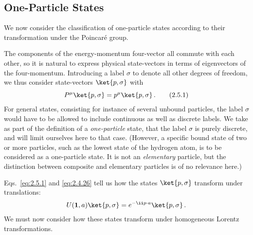 \subsection{One-Particle States}

We now consider the classification of one-particle states according to their
transformation under the Poincar\'e group.

The components of the energy-momentum four-vector all commute with each other,
so it is natural to express physical state-vectors in terms of eigenvectors of
the four-momentum. Introducing a label $\sigma$ to denote all other degrees of
freedom, we thus consider state-vectors $\ket{p,\sigma}$ with
\begin{equation}
P^\mu\ket{p,\sigma}=p^\mu\ket{p,\sigma}\,.
\tag{2.5.1}\label{eq:2.5.1}
\end{equation}
For general states, consisting for instance of several unbound particles, the
label $\sigma$ would have to be allowed to include continuous as well as
discrete labels. We take as part of the definition of a \emph{one-particle}
state, that the label $\sigma$ is purely discrete, and will limit ourselves
here to that case. (However, a specific bound state of two or more particles,
such as the lowest state of the hydrogen atom, is to be considered as a
one-particle state. It is not an \emph{elementary} particle, but the distinction
between composite and elementary particles is of no relevance here.)

Eqs.~\eqref{eq:2.5.1} and \eqref{eq:2.4.26} tell us how the states $\ket{p,\sigma}$ transform
under translations:
\[
U(\mathbf{1},a)\ket{p,\sigma}=e^{-\ii p\cdot a}\ket{p,\sigma}\,.
\]
We must now consider how these states transform under homogeneous Lorentz
transformations.

